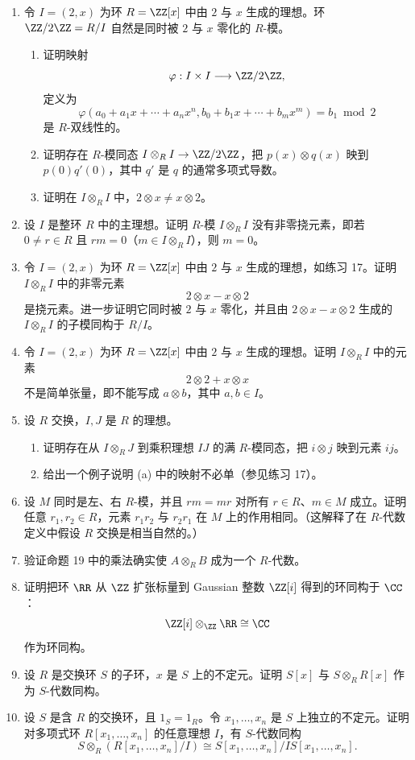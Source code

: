 \begin{enumerate}[label=\arabic*.]
\begin{enumerate}[label=(\alph*)]
		\[
		R/I\otimes_RR/J\cong R/(I+J),
		\]
		它把 $(r\bmod I)\otimes(r'\bmod J)$ 映到 $rr'\bmod(I+J)$。
	\end{enumerate}
	\item 令 $I=(2,x)$ 为环 $R=\ZZ[x]$ 中由 $2$ 与 $x$ 生成的理想。环 $\ZZ/2\ZZ=R/I$ 自然是同时被 $2$ 与 $x$ 零化的 $R$-模。
	\begin{enumerate}[label=(\alph*)]
		\item 证明映射
		\[
		\varphi:I\times I\longrightarrow \ZZ/2\ZZ,
		\]
		定义为
		\[
		\varphi(a_0+a_1x+\cdots+a_nx^n,
		b_0+b_1x+\cdots+b_mx^m)=b_1\bmod2
		\]
		是 $R$-双线性的。
		\item 证明存在 $R$-模同态 $I\otimes_R I\to\ZZ/2\ZZ$，把 $p(x)\otimes q(x)$ 映到 $p(0)q'(0)$，其中 $q'$ 是 $q$ 的通常多项式导数。
		\item 证明在 $I\otimes_R I$ 中，$2\otimes x\neq x\otimes2$。
	\end{enumerate}
	\item 设 $I$ 是整环 $R$ 中的主理想。证明 $R$-模 $I\otimes_RI$ 没有非零挠元素，即若 $0\neq r\in R$ 且 $rm=0$（$m\in I\otimes_RI$），则 $m=0$。
	\item 令 $I=(2,x)$ 为环 $R=\ZZ[x]$ 中由 $2$ 与 $x$ 生成的理想，如练习 17。证明 $I\otimes_RI$ 中的非零元素
	\[
	2\otimes x-x\otimes2
	\]
	是挠元素。进一步证明它同时被 $2$ 与 $x$ 零化，并且由 $2\otimes x-x\otimes2$ 生成的 $I\otimes_RI$ 的子模同构于 $R/I$。
	\item 令 $I=(2,x)$ 为环 $R=\ZZ[x]$ 中由 $2$ 与 $x$ 生成的理想。证明 $I\otimes_RI$ 中的元素
	\[
	2\otimes2+x\otimes x
	\]
	不是简单张量，即不能写成 $a\otimes b$，其中 $a,b\in I$。
	\item 设 $R$ 交换，$I,J$ 是 $R$ 的理想。
	\begin{enumerate}[label=(\alph*)]
		\item 证明存在从 $I\otimes_RJ$ 到乘积理想 $IJ$ 的满 $R$-模同态，把 $i\otimes j$ 映到元素 $ij$。
		\item 给出一个例子说明 (a) 中的映射不必单（参见练习 17）。
	\end{enumerate}
	\item 设 $M$ 同时是左、右 $R$-模，并且 $rm=mr$ 对所有 $r\in R$、$m\in M$ 成立。证明任意 $r_1,r_2\in R$，元素 $r_1r_2$ 与 $r_2r_1$ 在 $M$ 上的作用相同。（这解释了在 $R$-代数定义中假设 $R$ 交换是相当自然的。）
	\item 验证命题 19 中的乘法确实使 $A\otimes_RB$ 成为一个 $R$-代数。
	\item 证明把环 $\RR$ 从 $\ZZ$ 扩张标量到 Gaussian 整数 $\ZZ[i]$ 得到的环同构于 $\CC$：
	\[
	\ZZ[i]\otimes_{\ZZ}\RR\cong\CC
	\]
	作为环同构。
	\item 设 $R$ 是交换环 $S$ 的子环，$x$ 是 $S$ 上的不定元。证明 $S[x]$ 与 $S\otimes_RR[x]$ 作为 $S$-代数同构。
	\item 设 $S$ 是含 $R$ 的交换环，且 $1_S=1_R$。令 $x_1,
	\ldots,x_n$ 是 $S$ 上独立的不定元。证明对多项式环 $R[x_1,
	\ldots,x_n]$ 的任意理想 $I$，有 $S$-代数同构
	\[
	S\otimes_R(R[x_1,
	\ldots,x_n]/I)
	\cong S[x_1,
	\ldots,x_n]/IS[x_1,
	\ldots,x_n].
	\]
	

\end{enumerate}
